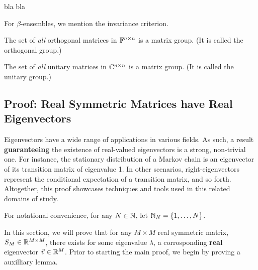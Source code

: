 \begin{theorem}
bla bla
\end{theorem}

For $\beta$-ensembles, we mention the invariance criterion.

\begin{theorem}
The set of {\em all} orthogonal matrices in $\mathbb{F}^{n\times n}$ is a matrix group. (It is called the {orthogonal group}.)
\end{theorem}

\begin{theorem}
The set of {\em all} unitary matrices in $\mathbb{C}^{n\times n}$ is a matrix group. (It is called the {unitary group}.)
\end{theorem}


\newpage

\subsection{Proof: Real Symmetric Matrices have Real Eigenvectors}


Eigenvectors have a wide range of applications in various fields. As such, a result \textbf{guaranteeing} the existence of real-valued eigenvectors is a strong, non-trivial one. For instance, the stationary distribution of a Markov chain is an eigenvector of its transition matrix of eigenvalue 1. In other scenarios, right-eigenvectors represent the conditional expectation of a transition matrix, and so forth. Altogether, this proof showcases techniques and tools used in this related domains of study. \newline


 For notational convenience, for any $N \in \mathbb{N}$, let $\mathbb{N}_{N} = \{1,\dots,N\}$.


In this section, we will prove that for any $M \times M$ real symmetric matrix, $S_M \in \mathbb{R}^{M \times M}$, there exists for some eigenvalue $\lambda$, a corrosponding \textbf{real} eigenvector $\vec{v} \in \mathbb{R}^M$. Prior to starting the main proof, we begin by proving a auxilliary lemma. \newline


